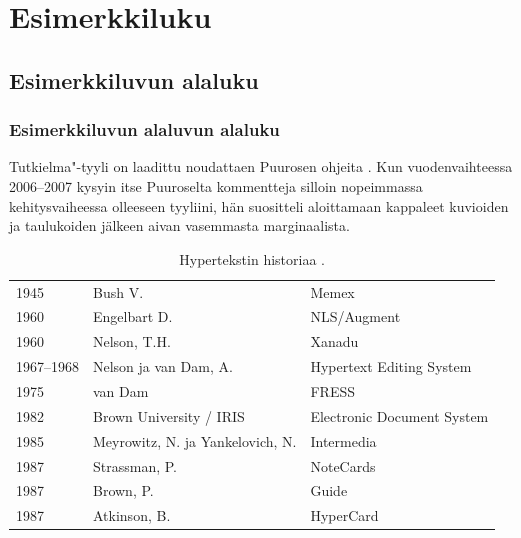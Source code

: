 \chapter{Esimerkkiluku}

\section{Esimerkkiluvun alaluku}

\subsection{Esimerkkiluvun alaluvun alaluku}

Tutkielma"-tyyli on laadittu noudattaen Puurosen ohjeita \citep{Puuronen2002Ohjeita-tutkimusraportin-kirjoittajalle}. Kun vuodenvaihteessa 2006--2007 kysyin itse Puuroselta kommentteja silloin nopeimmassa kehitysvaiheessa olleeseen tyyliini, hän suositteli aloittamaan kappaleet kuvioiden  ja taulukoiden  jälkeen aivan vasemmasta marginaalista.

\begin{table}[h!]
\caption[Hypertekstin historiaa]{Hypertekstin historiaa \citep[6--9]{Heimburg1989Hyperjarjestelmat}.}
\centering
\begin{tabular}{lll}
    1945        & Bush V.                   & Memex                     \\
    1960        & Engelbart D.              & NLS/Augment               \\
    1960        & Nelson, T.H.              & Xanadu                    \\
    1967--1968  & Nelson ja van Dam, A.       & Hypertext Editing System  \\
    1975        & van Dam                   & FRESS                     \\
    1982        & Brown University / IRIS   & Electronic Document System\\
    1985        & Meyrowitz, N. ja Yankelovich, N. & Intermedia          \\
    1987        & Strassman, P.             & NoteCards                 \\
    1987        & Brown, P.                 & Guide                     \\
    1987        & Atkinson, B.              & HyperCard                 \\
\end{tabular}
\label{tbl:Hypertekstin-historiaa}
\end{table}


